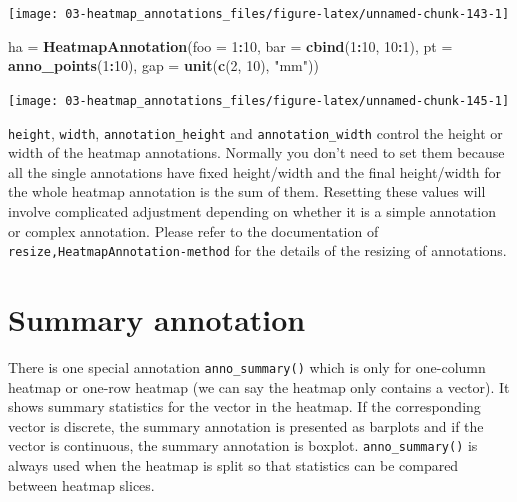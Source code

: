 \documentclass[]{book}
\newenvironment{Shaded}{\begin{snugshade}}{\end{snugshade}}
\newcommand{\KeywordTok}[1]{\textcolor[rgb]{0.13,0.29,0.53}{\textbf{#1}}}
\newcommand{\DataTypeTok}[1]{\textcolor[rgb]{0.13,0.29,0.53}{#1}}
\newcommand{\DecValTok}[1]{\textcolor[rgb]{0.00,0.00,0.81}{#1}}
\newcommand{\StringTok}[1]{\textcolor[rgb]{0.31,0.60,0.02}{#1}}
\newcommand{\OperatorTok}[1]{\textcolor[rgb]{0.81,0.36,0.00}{\textbf{#1}}}
\newcommand{\NormalTok}[1]{#1}
\theoremstyle{definition}
\theoremstyle{definition}
\theoremstyle{definition}
\theoremstyle{remark}
\begin{document}
\begin{center}\texttt{[image: 03-heatmap\_annotations\_files/figure-latex/unnamed-chunk-143-1]} \end{center}

\begin{Shaded}
\begin{Highlighting}[]
\NormalTok{ha =}\StringTok{ }\KeywordTok{HeatmapAnnotation}\NormalTok{(}\DataTypeTok{foo =} \DecValTok{1}\OperatorTok{:}\DecValTok{10}\NormalTok{, }
    \DataTypeTok{bar =} \KeywordTok{cbind}\NormalTok{(}\DecValTok{1}\OperatorTok{:}\DecValTok{10}\NormalTok{, }\DecValTok{10}\OperatorTok{:}\DecValTok{1}\NormalTok{),}
    \DataTypeTok{pt =} \KeywordTok{anno_points}\NormalTok{(}\DecValTok{1}\OperatorTok{:}\DecValTok{10}\NormalTok{),}
    \DataTypeTok{gap =} \KeywordTok{unit}\NormalTok{(}\KeywordTok{c}\NormalTok{(}\DecValTok{2}\NormalTok{, }\DecValTok{10}\NormalTok{), }\StringTok{"mm"}\NormalTok{))}
\end{Highlighting}
\end{Shaded}

\begin{center}\texttt{[image: 03-heatmap\_annotations\_files/figure-latex/unnamed-chunk-145-1]} \end{center}

\texttt{height}, \texttt{width}, \texttt{annotation\_height} and
\texttt{annotation\_width} control the height or width of the heatmap
annotations. Normally you don't need to set them because all the single
annotations have fixed height/width and the final height/width for the
whole heatmap annotation is the sum of them. Resetting these values will
involve complicated adjustment depending on whether it is a simple
annotation or complex annotation. Please refer to the documentation of
\texttt{resize,HeatmapAnnotation-method} for the details of the resizing
of annotations.

\section{Summary annotation}\label{summary-annotation}

There is one special annotation \texttt{anno\_summary()} which is only
for one-column heatmap or one-row heatmap (we can say the heatmap only
contains a vector). It shows summary statistics for the vector in the
heatmap. If the corresponding vector is discrete, the summary annotation
is presented as barplots and if the vector is continuous, the summary
annotation is boxplot. \texttt{anno\_summary()} is always used when the
heatmap is split so that statistics can be compared between heatmap
slices.
\end{document}
